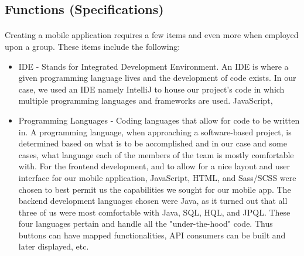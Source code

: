    \newpage
    \subsection{Functions (Specifications)} %
    \paragraph{}
    Creating a mobile application requires a few items and even more when employed upon a group. These items include the following:
    \begin{itemize}
    
        \item IDE - Stands for Integrated Development Environment. An IDE is where a given programming language lives and the development of code exists. In our case, we used an IDE namely IntelliJ to house our project's code in which multiple programming languages and frameworks are used. JavaScript, 
        
        
        \item Programming Languages - Coding languages that allow for code to be written in. A programming language, when approaching a software-based project, is determined based on what is to be accomplished and in our case and some cases, what language each of the members of the team is mostly comfortable with. For the frontend development, and to allow for a nice layout and user interface for our mobile application, JavaScript, HTML, and Sass/SCSS were chosen to best permit us the capabilities we sought for our mobile app. The backend development languages chosen were Java, as it turned out that all three of us were most comfortable with Java, SQL, HQL, and JPQL. These four languages pertain and handle all the "under-the-hood" code. Thus buttons can have mapped functionalities, API consumers can be built and later displayed, etc. 
        

\end{itemize}
